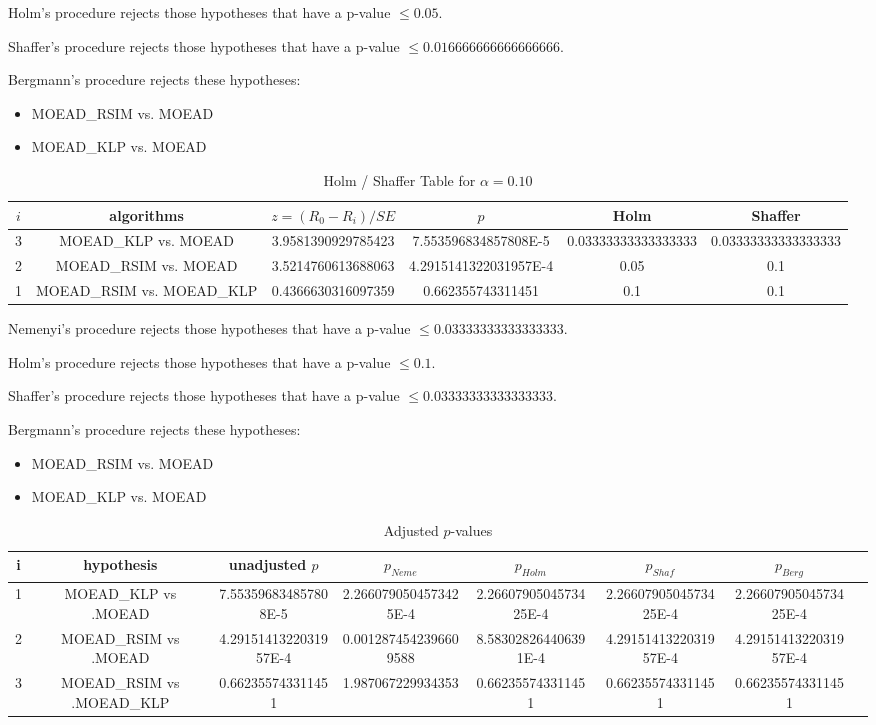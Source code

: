 \documentclass[a4paper,10pt]{article}
\begin{document}
\begin{landscape}
Holm's procedure rejects those hypotheses that have a p-value $\le0.05$.


Shaffer's procedure rejects those hypotheses that have a p-value $\le0.016666666666666666$.


Bergmann's procedure rejects these hypotheses:


\begin{itemize}


\item MOEAD_RSIM vs. MOEAD
\item MOEAD_KLP vs. MOEAD
\end{itemize}


\begin{table}[!htp]
\centering\tiny
\caption{Holm / Shaffer Table for $\alpha=0.10$}
\begin{tabular}{cccccc}
$i$&algorithms&$z=(R_0 - R_i)/SE$&$p$&Holm&Shaffer\\
\hline
3&MOEAD_KLP vs. MOEAD&3.9581390929785423&7.553596834857808E-5&0.03333333333333333&0.03333333333333333\\
2&MOEAD_RSIM vs. MOEAD&3.5214760613688063&4.2915141322031957E-4&0.05&0.1\\
1&MOEAD_RSIM vs. MOEAD_KLP&0.4366630316097359&0.662355743311451&0.1&0.1\\
\hline
\end{tabular}
\end{table}
Nemenyi's procedure rejects those hypotheses that have a p-value $\le0.03333333333333333$.


Holm's procedure rejects those hypotheses that have a p-value $\le0.1$.


Shaffer's procedure rejects those hypotheses that have a p-value $\le0.03333333333333333$.


Bergmann's procedure rejects these hypotheses:


\begin{itemize}


\item MOEAD_RSIM vs. MOEAD
\item MOEAD_KLP vs. MOEAD
\end{itemize}


\begin{table}[!htp]
\centering\tiny
\caption{Adjusted $p$-values}
\begin{tabular}{cccccccc}
i&hypothesis&unadjusted $p$&$p_{Neme}$&$p_{Holm}$&$p_{Shaf}$&$p_{Berg}$\\
\hline
1&MOEAD_KLP vs .MOEAD&7.553596834857808E-5&2.2660790504573425E-4&2.2660790504573425E-4&2.2660790504573425E-4&2.2660790504573425E-4\\
2&MOEAD_RSIM vs .MOEAD&4.2915141322031957E-4&0.0012874542396609588&8.583028264406391E-4&4.2915141322031957E-4&4.2915141322031957E-4\\
3&MOEAD_RSIM vs .MOEAD_KLP&0.662355743311451&1.987067229934353&0.662355743311451&0.662355743311451&0.662355743311451\\
\hline
\end{tabular}
\end{table}

\end{landscape}
\end{document}

